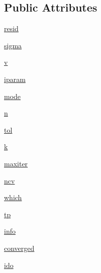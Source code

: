 \subsection*{Public Attributes}
\begin{DoxyCompactItemize}
\item 
\hyperlink{classscipy_1_1sparse_1_1linalg_1_1eigen_1_1arpack_1_1arpack_1_1__ArpackParams_a233b449c20c79842d5d0c2f97f7e4af7}{resid}
\item 
\hyperlink{classscipy_1_1sparse_1_1linalg_1_1eigen_1_1arpack_1_1arpack_1_1__ArpackParams_a7cb5129e0d6600cbbe94ad57754c61be}{sigma}
\item 
\hyperlink{classscipy_1_1sparse_1_1linalg_1_1eigen_1_1arpack_1_1arpack_1_1__ArpackParams_a18dd692a626ec3c49c16dbbde92a4a0e}{v}
\item 
\hyperlink{classscipy_1_1sparse_1_1linalg_1_1eigen_1_1arpack_1_1arpack_1_1__ArpackParams_a8ef68f3c05f44ec13ede4252a67cebc7}{iparam}
\item 
\hyperlink{classscipy_1_1sparse_1_1linalg_1_1eigen_1_1arpack_1_1arpack_1_1__ArpackParams_a7816ca579d4d97f3c510fddbb5485c76}{mode}
\item 
\hyperlink{classscipy_1_1sparse_1_1linalg_1_1eigen_1_1arpack_1_1arpack_1_1__ArpackParams_adef7005d9f2810e2874e469b4cd3585e}{n}
\item 
\hyperlink{classscipy_1_1sparse_1_1linalg_1_1eigen_1_1arpack_1_1arpack_1_1__ArpackParams_a360adb5143eba0576587c14cba014ca0}{tol}
\item 
\hyperlink{classscipy_1_1sparse_1_1linalg_1_1eigen_1_1arpack_1_1arpack_1_1__ArpackParams_a68948e70da7de68e5befc73349d16caf}{k}
\item 
\hyperlink{classscipy_1_1sparse_1_1linalg_1_1eigen_1_1arpack_1_1arpack_1_1__ArpackParams_a7107c6f382fd14632c925ed7bbc1bcc5}{maxiter}
\item 
\hyperlink{classscipy_1_1sparse_1_1linalg_1_1eigen_1_1arpack_1_1arpack_1_1__ArpackParams_a3c1ebc081630d86969f97457f5635ed5}{ncv}
\item 
\hyperlink{classscipy_1_1sparse_1_1linalg_1_1eigen_1_1arpack_1_1arpack_1_1__ArpackParams_a36cf48795ab2bad38250cc0ef29c215b}{which}
\item 
\hyperlink{classscipy_1_1sparse_1_1linalg_1_1eigen_1_1arpack_1_1arpack_1_1__ArpackParams_a6503920a18ec478f141543f7ee4d48b0}{tp}
\item 
\hyperlink{classscipy_1_1sparse_1_1linalg_1_1eigen_1_1arpack_1_1arpack_1_1__ArpackParams_ace820f41f09e3ff386e21f94119c876e}{info}
\item 
\hyperlink{classscipy_1_1sparse_1_1linalg_1_1eigen_1_1arpack_1_1arpack_1_1__ArpackParams_a275783c3d46718adddaa7e50e092300a}{converged}
\item 
\hyperlink{classscipy_1_1sparse_1_1linalg_1_1eigen_1_1arpack_1_1arpack_1_1__ArpackParams_a90f53a5cd0e31f141b51114f10979867}{ido}
\end{DoxyCompactItemize}


